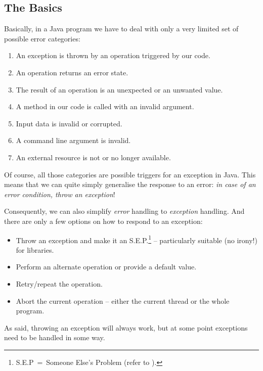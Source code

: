 \documentclass[11pt,a4paper, titlepage, parskip=half, headsepline, footsepline, cleardoublepage=current, headheight=1cm]{scrbook}
\begin{document}
\subsection{The Basics}
Basically, in a Java program we have to deal with only a very limited set of possible error categories:
\begin{enumerate}[nosep]
\item{An exception is thrown by an operation triggered by our code.}
\item{An operation returns an error state.}
\item{The result of an operation is an unexpected or an unwanted value.}
\item{A method in our code is called with an invalid argument.}
\item{Input data is invalid or corrupted.}
\item{A command line argument is invalid.}
\item{An external resource is not or no longer available.}
\end{enumerate}

Of course, all those categories are possible triggers for an exception in Java. This means that we can quite simply generalise the response to an error: \textit{in case of an error condition, throw an exception}!

Consequently, we can also simplify \textit{error} handling to \textit{exception} handling. And there are only a few options on how to respond to an exception:
\begin{itemize}
\item{Throw an exception and make it an S.E.P.\footnote{S.E.P~=~Someone Else's Problem (refer to \autocite{ADAMS_HITCHHIKERS_GUIDE}).} – particularly suitable (no irony!) for libraries.}
\item{Perform an alternate operation or provide a default value.}
\item{Retry/repeat the operation.}
\item{Abort the current operation – either the current thread or the whole program.}
\end{itemize}

As said, throwing an exception will always work, but at some point exceptions need to be handled in some way.
\end{document}
